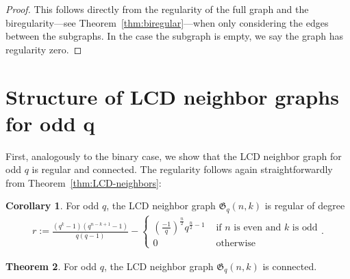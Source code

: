 \documentclass[11pt]{article}
\theoremstyle{definition}
\newtheorem{theorem}{Theorem}[section]
\newtheorem{corollary}[theorem]{Corollary}
\newcommand{\Leg}[2]{\left(\frac{#1}{#2}\right)}                       %
\newcommand{\Gq}{\mathfrak{G}}
\begin{document}
\begin{proof}
	This follows directly from the regularity of the full graph and the biregularity---see Theorem~\ref{thm:biregular}---when only considering the edges between the subgraphs.
	In the case the subgraph is empty, we say the graph has regularity zero.
\end{proof}


\section{Structure of LCD neighbor graphs for odd \texorpdfstring{$\mathbf{q}$}{q}}\label{sec:Structureqodd}

First, analogously to the binary case, we show that the LCD neighbor graph for odd $q$ is regular and connected.
The regularity follows again straightforwardly from Theorem~\ref{thm:LCD-neighbors}:

\begin{corollary}\label{cor:regular_odd}
	For odd $q$, the LCD neighbor graph $\Gq_q(n, k)$ is regular of degree 
	\begin{align*}
		r := \frac{(q^k - 1)(q^{n - k + 1} - 1)}{q (q - 1)} - \begin{cases}
			\Leg{-1}{q}^\frac{n}{2} q^{\frac{n}{2} - 1} & \text{ if $n$ is even and $k$ is odd}\\
			0 & \text{ otherwise}
		\end{cases}.
	\end{align*}
\end{corollary}

\begin{theorem}
	For odd $q$, the LCD neighbor graph $\Gq_q(n, k)$ is connected.
\end{theorem}
\end{document}
